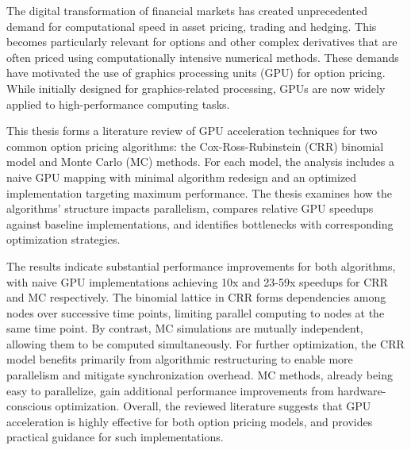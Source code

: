 \documentclass[english,12pt,a4paper,pdftex,sci,utf8]{aaltothesis}
\begin{document}
\begin{abstractpage}[english]
The digital transformation of financial markets has created unprecedented demand for computational speed in asset pricing, trading and hedging. This becomes particularly relevant for options and other complex derivatives that are often priced using computationally intensive numerical methods. These demands have motivated the use of graphics processing units (GPU) for option pricing. While initially designed for graphics-related processing, GPUs are now widely applied to high-performance computing tasks.

This thesis forms a literature review of GPU acceleration techniques for two common option pricing algorithms: the Cox-Ross-Rubinstein (CRR) binomial model and Monte Carlo (MC) methods. For each model, the analysis includes a naive GPU mapping with minimal algorithm redesign and an optimized implementation targeting maximum performance. The thesis examines how the algorithms' structure impacts parallelism, compares relative GPU speedups against baseline implementations, and identifies bottlenecks with corresponding optimization \mbox{strategies.}

The results indicate substantial performance improvements for both algorithms, with naive GPU implementations achieving 10x and 23-59x speedups for CRR and MC respectively. The binomial lattice in CRR forms dependencies among nodes over successive time points, limiting parallel computing to nodes at the same time point. By contrast, MC simulations are mutually independent, allowing them to be computed simultaneously. For further optimization, the CRR model benefits primarily from algorithmic restructuring to enable more parallelism and mitigate synchronization overhead. MC methods, already being easy to parallelize, gain additional performance improvements from hardware-conscious optimization. Overall, the reviewed literature suggests that GPU acceleration is highly effective for both option pricing models, and provides practical guidance for such implementations. 
\end{abstractpage}

\newpage
%
\end{document}
